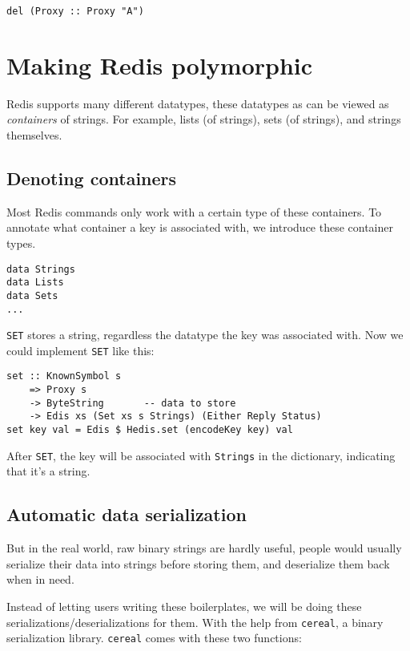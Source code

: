 \documentclass[pldi]{sigplanconf-pldi16}
\begin{document}
\begin{verbatim}
del (Proxy :: Proxy "A")
\end{verbatim}

\section{Making Redis polymorphic}

Redis supports many different datatypes, these datatypes as can be viewed as
 \emph{containers} of strings. For example, lists (of strings),
 sets (of strings), and strings themselves.

\subsection{Denoting containers}
Most Redis commands only work with a certain type of these containers. To
 annotate what container a key is associated with, we introduce these container
 types.

\begin{verbatim}
data Strings
data Lists
data Sets
...
\end{verbatim}

\texttt{SET} stores a string, regardless the datatype the key was
 associated with. Now we could implement \texttt{SET} like this:

\begin{verbatim}
set :: KnownSymbol s
    => Proxy s
    -> ByteString       -- data to store
    -> Edis xs (Set xs s Strings) (Either Reply Status)
set key val = Edis $ Hedis.set (encodeKey key) val
\end{verbatim}

After \texttt{SET}, the key will be associated with
 \texttt{Strings} in the dictionary, indicating that it's a string.

\subsection{Automatic data serialization}
But in the real world, raw binary strings are hardly useful, people would
 usually serialize their data into strings before storing them, and deserialize
 them back when in need.

Instead of letting users writing these boilerplates, we will be doing these
 serializations/deserializations for them. With the help from
 \texttt{cereal}, a binary serialization library.
 \texttt{cereal} comes with these two functions:
\end{document}
